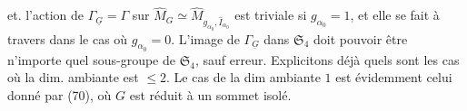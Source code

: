  et. l'action de $\Gamma_{\underline G}=\Gamma$ sur $\widehat M_G\simeq\widehat M_{g_{\alpha_0},\widehat I_{\alpha_0}}$ est triviale si $g_{\alpha_0}=1$, et elle se fait à travers
dans le cas où $g_{\alpha_0}=0$. L'image de $\Gamma_{\underline G}$ dans $\mathfrak S_4$ doit pouvoir être n'importe quel sous-groupe de $\mathfrak S_4$, sauf erreur. Explicitons déjà quels sont les cas où la dim. ambiante est $\leq2$. Le cas de la dim ambiante $1$  est évidemment celui donné par (70), où $G$ est réduit à un sommet isolé.

